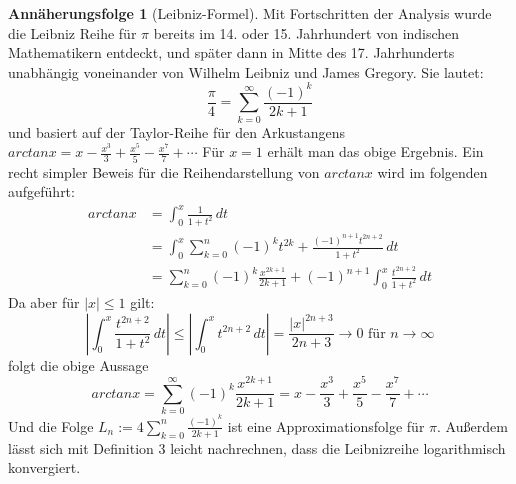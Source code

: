 \documentclass{scrartcl}
\theoremstyle{definition}
\newtheorem{approximation sequence}{Annäherungsfolge}
\begin{document}
\begin{approximation sequence}[Leibniz-Formel]
Mit Fortschritten der Analysis wurde die Leibniz Reihe für \(\pi\) bereits im 14. 
oder 15. Jahrhundert von indischen Mathematikern entdeckt, und später dann in 
Mitte des 17. Jahrhunderts unabhängig voneinander von Wilhelm Leibniz und James Gregory.
Sie lautet:
\[ \frac{\pi}{4} = \sum_{k=0}^{\infty} \frac{(-1)^k}{2k+1} \]
und basiert auf der Taylor-Reihe für den Arkustangens \(arctanx = x - \frac{x^3}{3} + \frac{x^5}{5} - \frac{x^7}{7} + \cdots \)
Für \(x = 1\) erhält man das obige Ergebnis.
Ein recht simpler Beweis für die Reihendarstellung von \(arctanx\) wird im folgenden aufgeführt: \cite{Leibniz}
\begin{equation} 
    \begin{split}
    arctanx & = \int_{0}^{x} \frac{1}{1+t^2}\,dt \\
    & = \int_{0}^{x}\sum_{k=0}^{n}(-1)^k t^{2k} + \frac{(-1)^{n+1}t^{2n+2}}{1+t^2}\,dt \\
    & = \sum_{k=0}^{n}(-1)^k \frac{x^{2k+1}}{2k+1} + (-1)^{n+1}\int_{0}^{x}\frac{t^{2n+2}}{1+t^2}\,dt
    \end{split}
    \end{equation}
Da aber für \(|x| \leqslant 1\) gilt: \[|\int_{0}^{x}\frac{t^{2n+2}}{1+t^2}\,dt| \leqslant |\int_{0}^{x}t^{2n+2}\,dt| = \frac{|x|^{2n+3}}{2n+3} \rightarrow 0 \text{ für } n \rightarrow \infty \]
folgt die obige Aussage
\[arctanx = \sum_{k=0}^{\infty}(-1)^k \frac{x^{2k+1}}{2k+1} = x - \frac{x^3}{3} + \frac{x^5}{5} - \frac{x^7}{7} + \cdots \] 
Und die Folge \(L_n := 4\sum_{k=0}^{n} \frac{(-1)^k}{2k+1} \) ist eine Approximationsfolge für \(\pi\).
Außerdem lässt sich mit Definition 3 leicht nachrechnen, dass die Leibnizreihe logarithmisch konvergiert. 
\end{approximation sequence}
\end{document}
